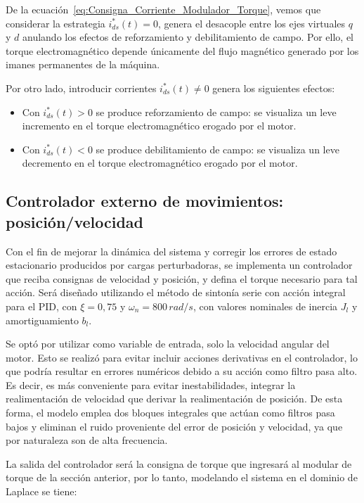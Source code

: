 \documentclass{article}
\begin{document}
De la ecuación~\ref{eq:Consigna_Corriente_Modulador_Torque}, vemos que considerar la estrategia \(i_{ds}^*(t) = 0\), genera el desacople entre los ejes virtuales \(q\) y \(d\) anulando los efectos de reforzamiento y debilitamiento de campo. Por ello, el torque electromagnético depende únicamente del flujo magnético generado por los imanes permanentes de la máquina.

Por otro lado, introducir corrientes \(i_{ds}^*(t) \neq 0\) genera los siguientes efectos:

\begin{itemize}
   \item Con \(i_{ds}^*(t) > 0\) se produce reforzamiento de campo: se visualiza un leve incremento en el torque electromagnético erogado por el motor.
   \item Con \(i_{ds}^*(t) < 0\) se produce debilitamiento de campo: se visualiza un leve decremento en el torque electromagnético erogado por el motor.
\end{itemize}

\subsection{Controlador externo de movimientos: posición/velocidad}

Con el fin de mejorar la dinámica del sistema y corregir los errores de estado estacionario producidos por cargas 
perturbadoras, se implementa un controlador que reciba consignas de velocidad y posición, y defina el torque necesario para 
tal acción. Será diseñado utilizando el método de sintonía serie con acción integral para el PID, con $\xi = 0,75$ y $\omega_n = 800\,  {rad/s}$, 
con valores nominales de inercia \(J_l\) y amortiguamiento \(b_l\).

Se optó por utilizar como variable de entrada, solo la velocidad angular del motor. Esto se realizó para evitar incluir acciones 
derivativas en el controlador, lo que podría resultar en errores numéricos debido a su acción como filtro pasa alto. Es decir, es 
más conveniente para evitar inestabilidades, integrar la realimentación de velocidad que derivar la realimentación de posición. De esta 
forma, el modelo emplea dos bloques integrales que actúan como filtros pasa bajos y eliminan el ruido proveniente del error 
de posición y velocidad, ya que por naturaleza son de alta frecuencia.

La salida del controlador será la consigna de torque que ingresará al modular de torque de la sección anterior, por lo tanto, 
modelando el sistema en el dominio de Laplace se tiene:
\end{document}
